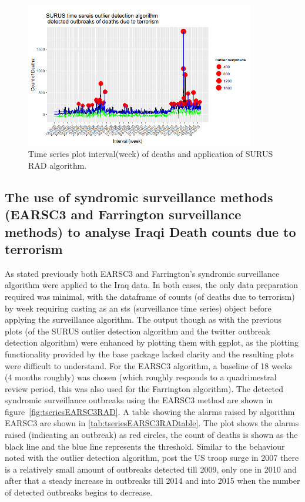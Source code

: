 \begin{figure}[t]
\includegraphics[width=10cm]{Peters_experiment_markdown_files/figure-latex/Surus_Rad_iraq.png}
\caption{Time series plot interval(week) of deaths and application of SURUS RAD algorithm.}
\label{fig:tseriessurusrad}
\centering
\end{figure}


\subsection{The use of syndromic surveillance methods (EARSC3 and Farrington surveillance methods) to analyse Iraqi Death counts due to terrorism} 

As stated previously both EARSC3 and Farrington's syndromic surveillance algorithm were applied to the Iraq data. In both cases, the only data preparation required was minimal, with the dataframe of counts (of deaths due to terrorism) by week requiring casting as an sts (surveillance time series) object before applying the surveillance algorithm. The output though as with the previous plots (of the SURUS outlier detection algorithm and the twitter outbreak detection algorithm) were enhanced by plotting them with ggplot, as the plotting functionality provided by the base package lacked clarity and the resulting plots were difficult to understand. For the EARSC3 algorithm, a baseline of 18 weeks (4 months roughly) was chosen (which roughly responds to a  quadrimestral review period, this was also used for the Farrington algorithm). The detected syndromic surveillance outbreaks using the EARSC3 method are shown in figure~\ref{fig:tseriesEARSC3RAD}. A table showing the alarms raised by algorithm EARSC3 are shown in \ref{tab:tseriesEARSC3RADtable}. The plot shows the alarms raised (indicating an outbreak) as red circles, the count of deaths is shown as the black line and the blue line represents the threshold. Similar to the behaviour noted with the outlier detection algorithm, post the US troop surge in 2007 there is a relatively small amount of outbreaks detected till 2009, only one in 2010 and after that a steady increase in outbreaks till 2014 and into 2015 when the number of detected outbreaks begins to decrease.

